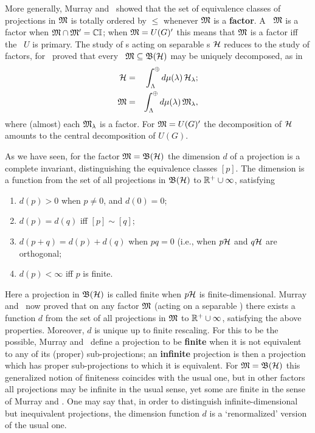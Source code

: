More generally, Murray and \vN\ showed that the set of equivalence
classes of projections in ${\frak M}$ is totally ordered by $\leq$ whenever
${\frak M}$ is a {\bf factor}.  A \vNa\ ${\frak M}$ is a factor when
${\frak M}\cap{\frak M}'={\Bbb C}{\Bbb I}$; when ${\frak M}=U(G)'$ this means that ${\frak M}$ is a factor iff
the \rep\ $U$ is primary. The study of \vNa s acting on separable \Hs
s ${\cal H}$ reduces to the study of factors, for \vN\ proved that every
\vNa\ ${\frak M}\subseteq{\frak B}({\cal H})$ may be uniquely decomposed, as in
\begin{eqnarray*}
{\cal H} & = & \int_{\Lambda}^{\oplus}d\mu(\lambda)\, {\cal H}_{\lambda};\\ {\frak M} & = &
\int_{\Lambda}^{\oplus}d\mu(\lambda)\, {\frak M}_{\lambda},
\end{eqnarray*}
where (almost) each ${\frak M}_{\lambda}$ is a factor.  For ${\frak M}=U(G)'$ the
decomposition of ${\cal H}$ amounts to the central decomposition of $U(G)$.

As we have seen, for the factor ${\frak M}={\frak B}({\cal H})$ the dimension $d$ of a
projection is a complete invariant, distinguishing the equivalence
classes $[p]$. The dimension is a function from the set of all
projections in ${\frak B}({\cal H})$ to ${\Bbb R}^+\cup\infty$, satisfying
\begin{enumerate}
\item
$d(p)>0$ when $p\neq 0$, and $d(0)=0$;
\item
$d(p)=d(q)$ iff $[p]\sim[q]$;
\item
$d(p+q)=d(p)+d(q)$ when $pq=0$ (i.e., when $p{\cal H}$ and $q{\cal H}$ are
orthogonal;
\item
$d(p)<\infty$ iff $p$ is finite.
\end{enumerate}
Here a projection in ${\frak B}({\cal H})$ is called finite when $p{\cal H}$ is
 finite-dimensional.  Murray and \vN\ now proved that on any factor
 ${\frak M}$ (acting on a separable \Hs) there exists a function $d$ from the
 set of all projections in ${\frak M}$ to ${\Bbb R}^+\cup\infty$, satisfying the
 above properties.  Moreover, $d$ is unique up to finite rescaling.
 For this to be the possible, Murray and \vN\ define a projection to
 be {\bf finite} when it is not equivalent to any of its (proper)
 sub-projections; an {\bf infinite} projection is then a projection
 which has proper sub-projections to which it is equivalent. For
 ${\frak M}={\frak B}({\cal H})$ this generalized notion of finiteness coincides with the
 usual one, but in other factors all projections may be infinite in
 the usual sense, yet some are finite in the sense of Murray and
 \vN. One may say that, in order to distinguish infinite-dimensional
 but inequivalent projections, the dimension function $d$ is a
 `renormalized' version of the usual one.

